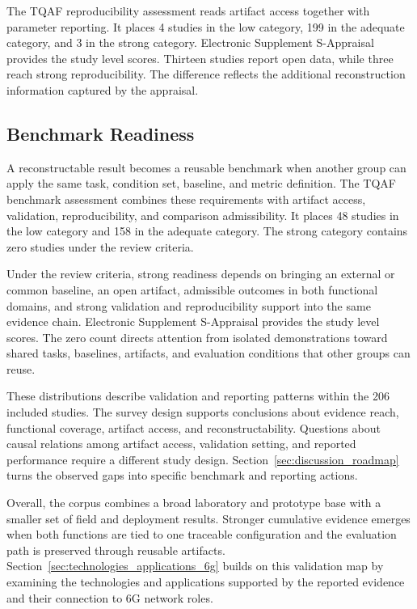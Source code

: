 The TQAF reproducibility assessment reads artifact access together with
parameter reporting. It places 4 studies in the low category, 199 in the
adequate category, and 3 in the strong category. Electronic Supplement
S-Appraisal provides the study level scores. Thirteen studies report open data,
while three reach strong reproducibility. The difference reflects the
additional reconstruction information captured by the appraisal.

\subsection{Benchmark Readiness}

A reconstructable result becomes a reusable benchmark when another group can
apply the same task, condition set, baseline, and metric definition. The TQAF
benchmark assessment combines these requirements with artifact access,
validation, reproducibility, and comparison admissibility. It places 48
studies in the low category and 158 in the adequate category. The strong
category contains zero studies under the review criteria.

Under the review criteria, strong readiness depends on bringing an external or
common baseline, an open artifact, admissible outcomes in both functional
domains, and strong validation and reproducibility support into the same
evidence chain. Electronic Supplement S-Appraisal provides the study level
scores. The zero count directs attention from isolated demonstrations toward
shared tasks, baselines, artifacts, and evaluation conditions that other groups
can reuse.

These distributions describe validation and reporting patterns within the 206
included studies. The survey design supports conclusions about evidence reach,
functional coverage, artifact access, and reconstructability. Questions about
causal relations among artifact access, validation setting, and reported
performance require a different study design. Section~\ref{sec:discussion_roadmap}
turns the observed gaps into specific benchmark and reporting actions.

Overall, the corpus combines a broad laboratory and prototype base with a
smaller set of field and deployment results. Stronger cumulative evidence
emerges when both functions are tied to one traceable configuration and the
evaluation path is preserved through reusable artifacts. Section~\ref{sec:technologies_applications_6g}
builds on this validation map by examining the technologies and applications
supported by the reported evidence and their connection to 6G network roles.

